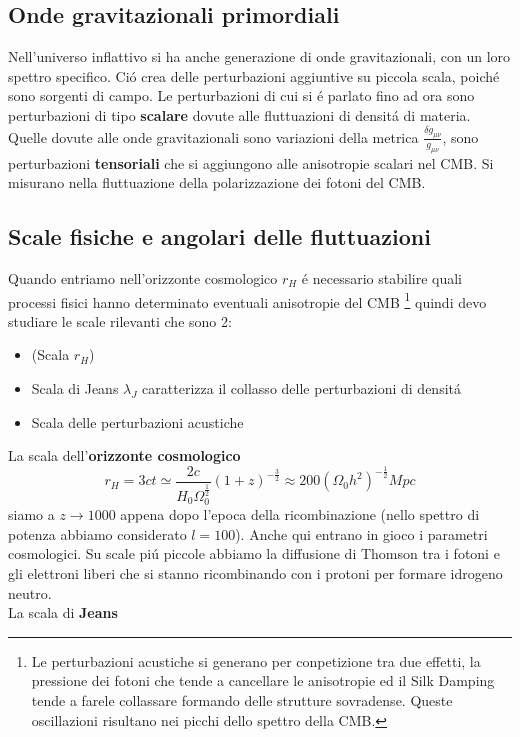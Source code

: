 \documentclass[12pt, a4paper]{article}
\begin{document}
\subsection{Onde gravitazionali primordiali}
Nell'universo inflattivo si ha anche generazione di onde gravitazionali, con un loro spettro specifico. Ci\'{o} crea delle perturbazioni aggiuntive su piccola scala, poich\'{e} sono sorgenti di campo. Le perturbazioni di cui si \'{e} parlato fino ad ora sono perturbazioni di tipo \textbf{scalare} dovute alle fluttuazioni di densit\'{a} di materia. Quelle dovute alle onde gravitazionali sono variazioni della metrica $\frac{\delta g_{\mu \nu}}{g_{\mu \nu}}$, sono perturbazioni \textbf{tensoriali} che si aggiungono alle anisotropie scalari nel CMB. Si misurano nella fluttuazione della polarizzazione dei fotoni del CMB.
\subsection{Scale fisiche e angolari delle fluttuazioni}
Quando entriamo nell'orizzonte cosmologico $r_H$ \'{e} necessario stabilire quali processi fisici hanno determinato eventuali anisotropie del CMB \footnote{Le perturbazioni acustiche si generano per conpetizione tra due effetti, la pressione dei fotoni che tende a cancellare le anisotropie ed il Silk Damping tende a farele collassare formando delle strutture sovradense. Queste oscillazioni risultano nei picchi dello spettro della CMB.} quindi devo studiare le scale rilevanti che sono 2:
\begin{itemize}
\item (Scala $r_H$)
\item Scala di Jeans $\lambda_J$ caratterizza il collasso delle perturbazioni di densit\'{a}
\item Scala delle perturbazioni acustiche 
\end{itemize}
La scala dell'\textbf{orizzonte cosmologico} 
\begin{equation}
r_H=3ct\simeq \frac{2c}{H_0 \Omega_0^{\frac{1}{2}}}(1+z)^{-\frac{3}{2}} \approx 200 (\Omega_0 h^2)^{-\frac{1}{2}} Mpc
\end{equation}
siamo a $z\rightarrow 1000$ appena dopo l'epoca della ricombinazione (nello spettro di potenza abbiamo considerato $l=100$). Anche qui entrano in gioco i parametri cosmologici. Su scale pi\'{u} piccole abbiamo la diffusione di Thomson tra i fotoni e gli elettroni liberi che si stanno ricombinando con i protoni per formare idrogeno neutro.\\
La scala di \textbf{Jeans}
\end{document}
